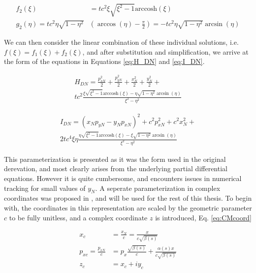 \begin{equation} \label{eq:nonFgNorm}
\begin{split}
	f_2(\xi) &= t c^2 \xi \sqrt{\xi^2 -1} \textrm{arccosh}(\xi) \\
	g_2(\eta) = t c^2 \eta \sqrt{1-\eta^2}&\left(\arccos{(\eta) - \frac{\pi}{2}}\right) = -t c^2 \eta \sqrt{1-\eta^2}\arcsin{(\eta)}
\end{split}
\end{equation}

We can then consider the linear combination of these individual solutions, i.e. $f(\xi) = f_1(\xi)+f_2(\xi)$, and after substitution and simplification, we arrive at the form of the equations in Equations \ref{eq:H_DN} and \ref{eq:I_DN}.

\begin{multline} \label{eq:H_DN}
	H_{DN} = \frac{p_{xN}^2}{2} + \frac{p_{yN}^2}{2}  + \frac{x_{N}^2}{2} + \frac{y_{N}^2}{2} +\\
	tc^2 \frac{\xi \sqrt{\xi^2 -1} \textrm{arccosh}(\xi) - \eta \sqrt{1-\eta^2}\arcsin{(\eta)}}{\xi^2 - \eta^2} 
\end{multline}

\begin{multline} \label{eq:I_DN}
	I_{DN} = (x_N p_{yN} - y_N p_{xN})^2 + c^2 p_{xN}^2 + c^2 x_N^2 +\\ 
	2t c^4 \xi \eta \frac{\eta\sqrt{\xi^2 -1} \textrm{arccosh}(\xi) - \xi \sqrt{1-\eta^2}\arcsin{(\eta)}}{\xi^2 - \eta^2}
\end{multline}

This parameterization is presented as it was the form used in the original derevation, and most clearly arises from the underlying partial differential equations. However it is quite cumbersome, and encounters issues in numerical tracking for small values of $y_N$. A seperate parameterization in complex coordinates was proposed in \cite{Mitchell}, and will be used for the rest of this thesis. To begin with, the coordinates in this representation are scaled by the geometric parameter $c$ to be fully unitless, and a complex coordinate $z$ is introduced, Eq. \ref{eq:CMcoord}

\begin{equation} \label{eq:CMcoord}
\begin{split}
	x_c &= \frac{x_N}{c} = \frac{x}{c\sqrt{\beta(s)}}\\
	p_{xc} = \frac{p_{xN}}{c} &= p_x\frac{\sqrt{\beta(s)}}{c} + \frac{\alpha(s)x}{c\sqrt{\beta(s)}}\\
	z_c &= x_c + iy_c
\end{split}
\end{equation}

